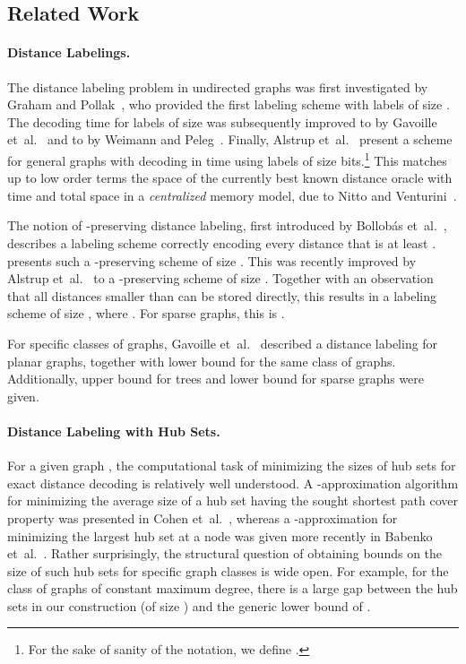 \documentclass{article}[11pt,letter]
\newcommand{\etal}{{et~al.}\xspace}
\begin{document}
\subsection{Related Work}

\paragraph{Distance Labelings.}
The distance labeling problem in undirected graphs was first investigated by Graham and Pollak~\cite{pollak}, who provided the first labeling scheme with labels of size . The decoding time for labels of size  was subsequently improved to  by Gavoille \etal~\cite{Gavoille:2004:DLG:1036161.1036165} and to  by Weimann and Peleg~\cite{WP11}. Finally, Alstrup \etal~\cite{DBLP:conf/soda/AlstrupGHP16} present a scheme for general graphs with decoding in  time using labels of size  bits.\footnote{For the sake of sanity of the notation, we define .} This matches up to low order terms the space of the currently best known distance oracle with  time and  total space in a \emph{centralized} memory model, due to Nitto and Venturini~\cite{NV08}.

The notion of -preserving distance labeling, first introduced by Bollob\'as \etal~\cite{BCE05}, describes a labeling scheme correctly encoding every distance that is at least . \cite{BCE05} presents such a -preserving scheme of size .
This was recently improved by Alstrup \etal~\cite{Sublinear} to a -preserving scheme of size . Together with an observation that all distances smaller than  can be stored directly, this results in a labeling scheme of size , where . For sparse graphs, this is .

For specific classes of graphs, Gavoille \etal~\cite{Gavoille:2004:DLG:1036161.1036165} described a  distance labeling for planar graphs, together with  lower bound for the same class of graphs. Additionally,  upper bound for trees and  lower bound for sparse graphs were given.

\paragraph{Distance Labeling with Hub Sets.} For a given graph , the computational task of minimizing the sizes of hub sets  for exact distance decoding is relatively well understood. A -approximation algorithm for minimizing the average size of a hub set having the sought shortest path cover property was presented in Cohen \etal~\cite{Cohen:2003:RDQ:942270.944300}, whereas a -approximation for minimizing the largest hub set at a node was given more recently in Babenko \etal~\cite{DBLP:conf/icalp/BabenkoGGN13}. Rather surprisingly, the structural question of obtaining bounds on the size of such hub sets for specific graph classes is wide open. For example, for the class of graphs of constant maximum degree, there is a large gap between the hub sets in our construction (of size ) and the generic lower bound of .
\end{document}
